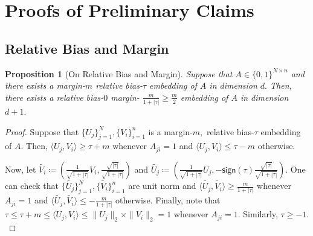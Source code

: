 \documentclass[preprint]{article}
\newtheorem{proposition}{Proposition}[]
\begin{document}
\newpage


\appendix

\section{Proofs of Preliminary Claims}
\label{appendix:somesimpleclaims}
\subsection{Relative Bias and Margin}

\begin{proposition}[On Relative Bias and Margin]
\label{prop:rb}
Suppose that $A\in \{0,1\}^{N\times n}$ and there exists a margin-$m$ relative bias-$\tau$ embedding of $A$ in dimension $d.$ Then, there exists a relative bias-$0$ margin- $\frac{m}{{1+|\tau|}}\ge\frac{m}{{2}}$ embedding of $A$ in dimension $d+1.$ 
\end{proposition}
\begin{proof}
Suppose that $\{U_j\}_{j = 1}^N, \{V_i\}_{i = 1}^n$ is a margin-$m,$ relative bias-$\tau$ embedding of $A.$ Then, $\langle U_j, V_i\rangle \ge \tau+m$ whenever $A_{ji} = 1$ and  
$\langle U_j, V_i\rangle \le \tau-m$ otherwise. 

Now, let $\widetilde{V_i}\coloneqq (\frac{1}{\sqrt{1+|\tau|}}V_i, \frac{\sqrt{|\tau|}}{\sqrt{1 + |\tau|}})$ and $\widetilde{U_j}\coloneqq (\frac{1}{\sqrt{1+|\tau|}}U_j, -\textsf{sign}(\tau)\frac{\sqrt{|\tau|}}{\sqrt{1 + |\tau|}}).$ One can check that $\{\widetilde{U_j}\}_{j = 1}^N, \{\widetilde{V_i}\}_{i = 1}^n$ are unit norm and $\langle \widetilde{U_j}, \widetilde{V_i}\rangle \ge \frac{m}{{1+|\tau|}}$ whenever $A_{ji} = 1$ and  
$\langle \widetilde{U_j}, \widetilde{V_i}\rangle \le -\frac{m}{{1+|\tau|}}$ otherwise. Finally, note that $\tau \le \tau+m \le \langle U_j, V_i\rangle\le \|U_j\|_2\times \|V_i\|_2 = 1$ whenever $A_{ji} = 1.$ Similarly, $\tau\ge -1.$
\end{proof}
\end{document}

